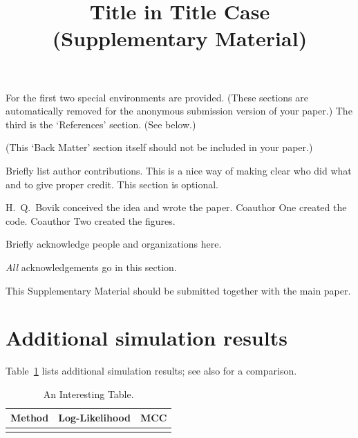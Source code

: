 \documentclass{uai2026} %
\begin{document}
For the first two special environments are provided.
(These sections are automatically removed for the anonymous submission version of your paper.)
The third is the ‘References’ section.
(See below.)

(This ‘Back Matter’ section itself should not be included in your paper.)

\begin{contributions} %
  Briefly list author contributions.
  This is a nice way of making clear who did what and to give proper credit.
  This section is optional.

  H.~Q.~Bovik conceived the idea and wrote the paper.
  Coauthor One created the code.
  Coauthor Two created the figures.
\end{contributions}

\begin{acknowledgements} %
  Briefly acknowledge people and organizations here.

  \emph{All} acknowledgements go in this section.
\end{acknowledgements}



\newpage

\onecolumn

\title{Title in Title Case\\(Supplementary Material)}
\maketitle

This Supplementary Material should be submitted together with the main paper.

\appendix
\section{Additional simulation results}
Table~\ref{tab:supp-data} lists additional simulation results; see also \citet{einstein} for a comparison.

\begin{table}[!h]
  \centering
  \caption{An Interesting Table.} \label{tab:supp-data}
  \begin{tabular}{rll}
    \toprule %
    \bfseries Method & \bfseries Log-Likelihood & \bfseries MCC\\
    \midrule %
     \\
    \bottomrule %
  \end{tabular}
\end{table}
\end{document}
